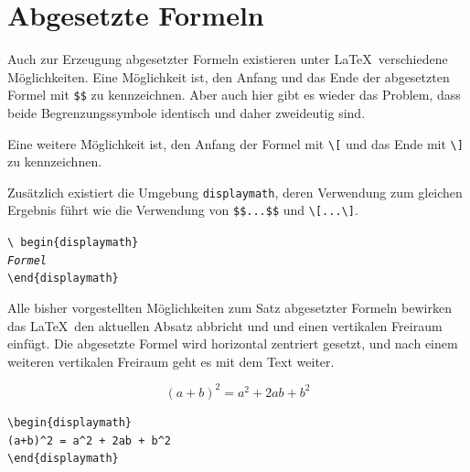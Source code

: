 \documentclass[a4paper,10pt,twoside]{scrbook}
\begin{document}
\section{Abgesetzte Formeln}

Auch zur Erzeugung abgesetzter Formeln existieren unter \LaTeX\ verschiedene
Möglichkeiten. Eine Möglichkeit ist, den Anfang und 
das Ende der abgesetzten Formel mit \verb!$$! zu kennzeichnen. 
Aber auch hier gibt es wieder das Problem, dass 
beide Begrenzungssymbole identisch und daher zweideutig sind. 



Eine weitere
Möglichkeit ist, den Anfang der Formel mit \verb!\[! und das Ende mit
\verb!\]! zu kennzeichnen.




Zusätzlich existiert die Umgebung \verb!displaymath!, 
deren Verwendung zum
gleichen Ergebnis führt wie die
Verwendung von \verb!$$...$$! und \verb!\[...\]!.

\begin{boxedminipage}{\textwidth}
\texttt{\textbackslash
begin\{displaymath\} \\
\textsl{Formel} \\
\textbackslash end\{displaymath\}}
\end{boxedminipage}


Alle bisher vorgestellten Möglichkeiten zum Satz abgesetzter Formeln bewirken das \LaTeX\ den aktuellen Absatz  
abbricht und und einen vertikalen
Freiraum einfügt. Die abgesetzte 
Formel wird horizontal zentriert 
gesetzt, und nach einem weiteren vertikalen 
Freiraum geht es mit dem Text weiter. 


\begin{minipage}[c]{.48\textwidth}
\setlength{\parskip}{1em}
\begin{displaymath}
(a+b)^2 = a^2 + 2ab + b^2
\end{displaymath}
\end{minipage}
\hfill
\begin{minipage}{.48\textwidth}
\setlength{\parskip}{1em}
\begin{lstlisting}[label=abgesetzteformelnbeispiel, style=customlatex]
\begin{displaymath}
(a+b)^2 = a^2 + 2ab + b^2
\end{displaymath}
\end{lstlisting}
\end{minipage}
\end{document}
